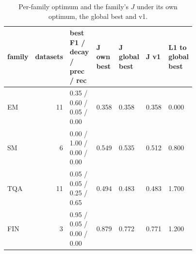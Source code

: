 \begin{table}[htbp]
\centering\tiny
\caption{Per-family optimum and the family's $J$ under its own optimum, the global best and v1.}
\label{tab:per_family}
\setlength{\tabcolsep}{3pt}
\begin{tabular}{lrp{0.210\linewidth}p{0.142\linewidth}p{0.142\linewidth}p{0.142\linewidth}p{0.135\linewidth}}
\toprule
family & datasets & best F1 / decay / prec / rec & J own best & J global best & J v1 & L1 to global best \\
\midrule
EM & 11 & 0.35 / 0.60 / 0.05 / 0.00 & 0.358 & 0.358 & 0.358 & 0.000 \\
SM & 6 & 0.00 / 1.00 / 0.00 / 0.00 & 0.549 & 0.535 & 0.512 & 0.800 \\
TQA & 11 & 0.05 / 0.05 / 0.25 / 0.65 & 0.494 & 0.483 & 0.483 & 1.700 \\
FIN & 3 & 0.95 / 0.05 / 0.00 / 0.00 & 0.879 & 0.772 & 0.771 & 1.200 \\
\bottomrule
\end{tabular}
\end{table}
